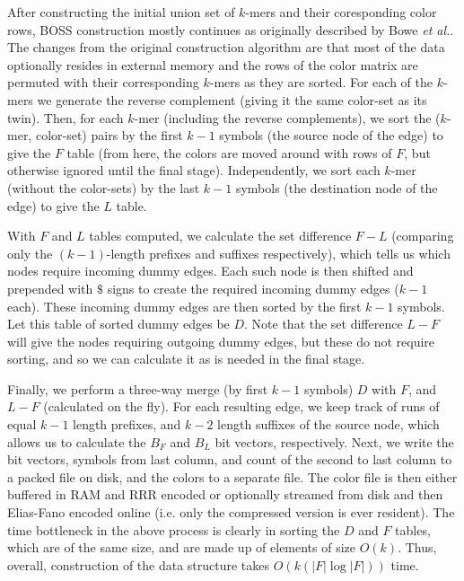 
After constructing the initial union set of $k$-mers and their coresponding color rows, BOSS construction mostly continues as originally described by Bowe {\it et al.}.  The changes from the original construction algorithm are that most of the data optionally resides in external memory and the rows of the color matrix are permuted with their corresponding $k$-mers as they are sorted.  For each of the $k$-mers we generate the reverse complement (giving it the same color-set as its twin). Then, for each $k$-mer (including the reverse complements),
we sort the ($k$-mer, color-set) pairs by the first $k-1$ symbols (the source node of the edge) to give the $F$ table (from here, the colors are moved around with rows of $F$, but otherwise ignored until 
the final stage). Independently, we sort each $k$-mer (without the color-sets) by the last $k-1$ symbols (the destination node of the edge) to give the $L$ table.

With $F$ and $L$ tables computed, we calculate the set difference $F-L$ (comparing only the $(k-1)$-length prefixes and suffixes respectively), which tells us which nodes require incoming dummy edges. Each such node is then
shifted and prepended with $\$$ signs to create the required incoming dummy edges ($k-1$ each). These incoming dummy edges are then sorted by the first $k-1$ symbols.
Let this table of sorted dummy edges be $D$. Note that the set difference $L - F$ will give the nodes requiring outgoing dummy edges, but these do not require sorting, and so we can calculate it as is needed in the final stage.

Finally, we perform a three-way merge (by first $k-1$ symbols) $D$ with $F$, and $L-F$ (calculated on the fly). For each resulting edge, we keep track of runs of equal $k-1$ length prefixes,
and $k-2$ length suffixes of the source node, which allows us to calculate the $B_F$ and $B_L$ bit vectors, respectively. Next, we write the bit vectors, symbols from last column, and
count of the second to last column to a packed file on disk, and the colors to a separate file.   The color file is then either buffered in RAM and RRR encoded or optionally streamed from disk and then Elias-Fano encoded online (i.e. only the compressed version is ever resident).  The time bottleneck in the above process is clearly in sorting the $D$ and $F$ tables, which are of the same size, and are made up of elements of size $O(k)$. Thus, overall, construction of the data structure takes $O(k(|F|\log|F|))$ time.



